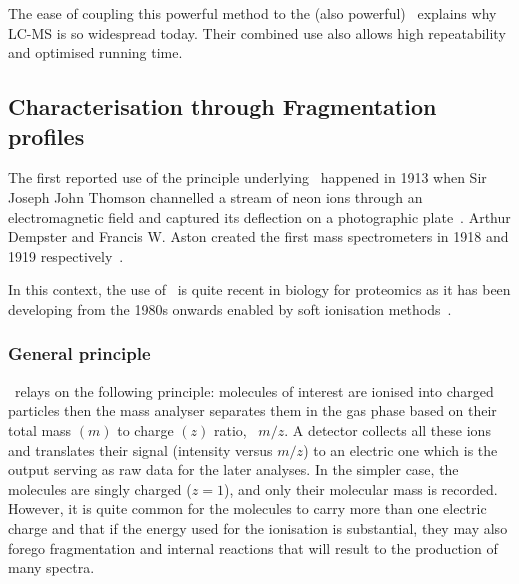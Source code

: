\vspace{-0.5mm}
The ease of coupling this powerful method to the (also powerful) \ms\ explains
why \gls{LC-MS} is so widespread today. Their combined use also allows high
repeatability and optimised running time.\mybr\
\vspace{-1mm}

\subsection{Characterisation through Fragmentation profiles}
\vspace{-3mm}

The first reported use of the principle underlying \ms\ happened in 1913 when
Sir Joseph John Thomson channelled a stream of neon ions through an electromagnetic
field and captured its deflection on a photographic plate~\mycite{Thomson1913}.
Arthur Dempster and Francis W. Aston created the first mass spectrometers in 1918
and 1919 respectively~\mycite{Aston1919}.
\begin{comment}
\ms\ became rapidly a pillar
of the so-called \emph{modern analytical techniques} in Chemistry as it allows
for a large spectrum of molecules of interest, the detection,
the characterisation and even, for the smaller ones, the resolution of their
structures.
\end{comment}
In this context, the use of \ms\ is quite recent in biology for proteomics
as it has been developing from the 1980s onwards
enabled by soft ionisation methods~.\mybr\

\subsubsection{General principle}

\ms\ relays on the following principle: molecules of interest are ionised
into charged particles then the mass analyser separates them in the gas phase
based on their total mass $(m)$ to charge $(z)$ ratio, \ie\ $m/z$.
A detector collects all these ions and translates their signal (intensity versus
$m/z$) to an electric one which is the output serving as raw data for the
later analyses. In the simpler case, the molecules are singly charged ($z=1$),
and only their molecular mass is recorded. However, it is quite common for the
molecules to carry more than one electric charge and that if the energy used for
the ionisation is substantial, they may also forego fragmentation and internal
reactions that will result to the production of many spectra.

